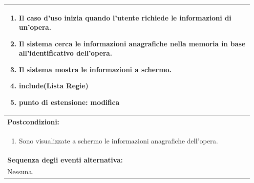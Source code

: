 \documentclass{article}
\begin{document}
\begin{table}[H]
\begin{tabular}{|p{\linewidth}|}
                        \begin{enumerate}
                            \item Il caso d'uso inizia quando l'utente richiede le informazioni di un'opera.
                            \item Il sistema cerca le informazioni anagrafiche nella memoria in base all'identificativo dell'opera.
                            \item Il sistema mostra le informazioni a schermo.
                            \item \textbf{include}(Lista Regie)
                            \item[] \textbf{punto di estensione:} modifica
                        \end{enumerate} \\
                        \hline
                        \cellcolor{gray!20}
                        \textbf{Postcondizioni:} \\
                        \cellcolor{gray!20}
                        \begin{minipage}{\linewidth}
                            \begin{enumerate}
                                \item Sono visualizzate a schermo le informazioni anagrafiche dell'opera.
                            \end{enumerate}
                        \end{minipage} \\
                        \hline
                        \textbf{Sequenza degli eventi alternativa:} \\
                        Nessuna. \\
                        \hline
                    \end{tabular}
                \end{table}
\end{document}
